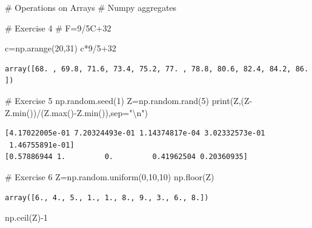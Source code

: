 \documentclass[
  letterpaper,
  DIV=11,
  numbers=noendperiod]{scrreprt}
\newenvironment{Shaded}{\begin{snugshade}}{\end{snugshade}}
\newcommand{\BuiltInTok}[1]{\textcolor[rgb]{0.00,0.23,0.31}{#1}}
\newcommand{\CharTok}[1]{\textcolor[rgb]{0.13,0.47,0.30}{#1}}
\newcommand{\CommentTok}[1]{\textcolor[rgb]{0.37,0.37,0.37}{#1}}
\newcommand{\DecValTok}[1]{\textcolor[rgb]{0.68,0.00,0.00}{#1}}
\newcommand{\NormalTok}[1]{\textcolor[rgb]{0.00,0.23,0.31}{#1}}
\newcommand{\OperatorTok}[1]{\textcolor[rgb]{0.37,0.37,0.37}{#1}}
\newcommand{\StringTok}[1]{\textcolor[rgb]{0.13,0.47,0.30}{#1}}
\begin{document}
\begin{Shaded}
\begin{Highlighting}[]
\CommentTok{\# Operations on Arrays}
\CommentTok{\# Numpy aggregates}

\CommentTok{\# Exercise 4}
\CommentTok{\# F=9/5C+32}

\NormalTok{c}\OperatorTok{=}\NormalTok{np.arange(}\DecValTok{20}\NormalTok{,}\DecValTok{31}\NormalTok{)}
\NormalTok{c}\OperatorTok{*}\DecValTok{9}\OperatorTok{/}\DecValTok{5}\OperatorTok{+}\DecValTok{32}
\end{Highlighting}
\end{Shaded}

\begin{verbatim}
array([68. , 69.8, 71.6, 73.4, 75.2, 77. , 78.8, 80.6, 82.4, 84.2, 86. ])
\end{verbatim}

\begin{Shaded}
\begin{Highlighting}[]
\CommentTok{\# Exercise 5}
\NormalTok{np.random.seed(}\DecValTok{1}\NormalTok{)}
\NormalTok{Z}\OperatorTok{=}\NormalTok{np.random.rand(}\DecValTok{5}\NormalTok{)}
\BuiltInTok{print}\NormalTok{(Z,(Z}\OperatorTok{{-}}\NormalTok{Z.}\BuiltInTok{min}\NormalTok{())}\OperatorTok{/}\NormalTok{(Z.}\BuiltInTok{max}\NormalTok{()}\OperatorTok{{-}}\NormalTok{Z.}\BuiltInTok{min}\NormalTok{()),sep}\OperatorTok{=}\StringTok{"}\CharTok{\textbackslash{}n}\StringTok{"}\NormalTok{)}
\end{Highlighting}
\end{Shaded}

\begin{verbatim}
[4.17022005e-01 7.20324493e-01 1.14374817e-04 3.02332573e-01
 1.46755891e-01]
[0.57886944 1.         0.         0.41962504 0.20360935]
\end{verbatim}

\begin{Shaded}
\begin{Highlighting}[]
\CommentTok{\# Exercise 6}
\NormalTok{Z}\OperatorTok{=}\NormalTok{np.random.uniform(}\DecValTok{0}\NormalTok{,}\DecValTok{10}\NormalTok{,}\DecValTok{10}\NormalTok{)}
\NormalTok{np.floor(Z)}
\end{Highlighting}
\end{Shaded}

\begin{verbatim}
array([6., 4., 5., 1., 1., 8., 9., 3., 6., 8.])
\end{verbatim}

\begin{Shaded}
\begin{Highlighting}[]
\NormalTok{np.ceil(Z)}\OperatorTok{{-}}\DecValTok{1}
\end{Highlighting}
\end{Shaded}
\end{document}
